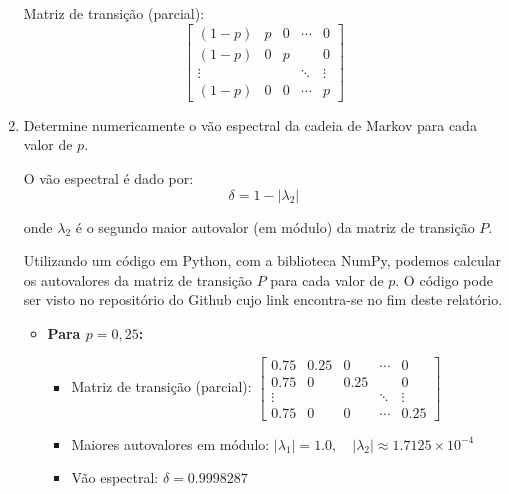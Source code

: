 \begin{enumerate}
\begin{resposta}
        Matriz de transição (parcial):
                $$
                \begin{bmatrix}
                    (1-p) & p & 0    & \cdots & 0 \\
                    (1-p) & 0    & p &        & 0 \\
                \vdots &     &     & \ddots & \vdots \\
                (1-p) & 0    & 0    & \cdots & p
                \end{bmatrix}
                $$

    \end{resposta}
    \item Determine numericamente o vão espectral da cadeia de Markov para cada valor de $p$.
    \begin{resposta}

        O vão espectral é dado por:
        $$\delta = 1 - |\lambda_2| $$
        
            onde $\lambda_2$ é o segundo maior autovalor (em módulo) da matriz de transição $P$.

        Utilizando um código em Python, com a biblioteca NumPy, podemos calcular os autovalores da matriz de transição $P$ para cada valor de $p$. O código pode ser visto no repositório do Github cujo link encontra-se no fim deste relatório.

        \begin{itemize}        
            \item \textbf{Para $p = 0{,}25$:}
            \begin{itemize}
                \item Matriz de transição (parcial):
                $
                \begin{bmatrix}
                0.75 & 0.25 & 0    & \cdots & 0 \\
                0.75 & 0    & 0.25 &        & 0 \\
                \vdots &     &     & \ddots & \vdots \\
                0.75 & 0    & 0    & \cdots & 0.25
                \end{bmatrix}
                $
                \item Maiores autovalores em módulo:
                $ |\lambda_1| = 1.0, \quad |\lambda_2| \approx 1.7125 \times 10^{-4} $
                \item Vão espectral:
                $ \boxed{\delta = 0.9998287} $
            \end{itemize}
        

\end{itemize}
\end{resposta}
\end{enumerate}
